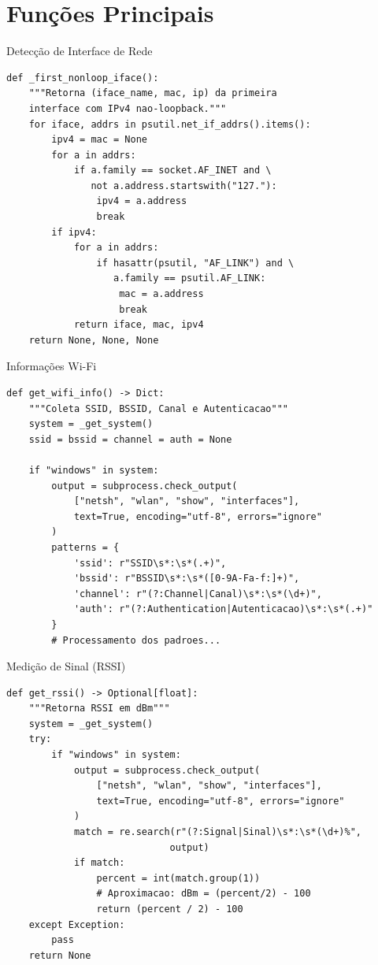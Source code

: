\documentclass[aspectratio=169]{beamer}
\begin{document}
\section{Funções Principais}

\begin{frame}[fragile]{Detecção de Interface de Rede}
\begin{lstlisting}[style=pythonstyle]
def _first_nonloop_iface():
    """Retorna (iface_name, mac, ip) da primeira 
    interface com IPv4 nao-loopback."""
    for iface, addrs in psutil.net_if_addrs().items():
        ipv4 = mac = None
        for a in addrs:
            if a.family == socket.AF_INET and \
               not a.address.startswith("127."):
                ipv4 = a.address
                break
        if ipv4:
            for a in addrs:
                if hasattr(psutil, "AF_LINK") and \
                   a.family == psutil.AF_LINK:
                    mac = a.address
                    break
            return iface, mac, ipv4
    return None, None, None
\end{lstlisting}
\end{frame}

\begin{frame}[fragile]{Informações Wi-Fi}
\begin{lstlisting}[style=pythonstyle]
def get_wifi_info() -> Dict:
    """Coleta SSID, BSSID, Canal e Autenticacao"""
    system = _get_system()
    ssid = bssid = channel = auth = None
    
    if "windows" in system:
        output = subprocess.check_output(
            ["netsh", "wlan", "show", "interfaces"],
            text=True, encoding="utf-8", errors="ignore"
        )
        patterns = {
            'ssid': r"SSID\s*:\s*(.+)",
            'bssid': r"BSSID\s*:\s*([0-9A-Fa-f:]+)",
            'channel': r"(?:Channel|Canal)\s*:\s*(\d+)",
            'auth': r"(?:Authentication|Autenticacao)\s*:\s*(.+)"
        }
        # Processamento dos padroes...
\end{lstlisting}
\end{frame}

\begin{frame}[fragile]{Medição de Sinal (RSSI)}
\begin{lstlisting}[style=pythonstyle]
def get_rssi() -> Optional[float]:
    """Retorna RSSI em dBm"""
    system = _get_system()
    try:
        if "windows" in system:
            output = subprocess.check_output(
                ["netsh", "wlan", "show", "interfaces"],
                text=True, encoding="utf-8", errors="ignore"
            )
            match = re.search(r"(?:Signal|Sinal)\s*:\s*(\d+)%", 
                             output)
            if match:
                percent = int(match.group(1))
                # Aproximacao: dBm = (percent/2) - 100
                return (percent / 2) - 100
    except Exception:
        pass
    return None
\end{lstlisting}
\end{frame}
\end{document}
